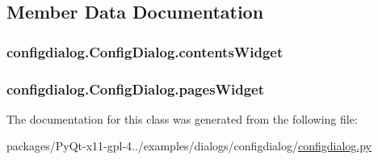 \subsection{Member Data Documentation}
\hypertarget{classconfigdialog_1_1ConfigDialog_a32b868578d2b6954f894bd13976c6652}{}
\subsubsection[{contents\+Widget}]{\setlength{\rightskip}{0pt plus 5cm}configdialog.\+Config\+Dialog.\+contents\+Widget}\label{classconfigdialog_1_1ConfigDialog_a32b868578d2b6954f894bd13976c6652}
\hypertarget{classconfigdialog_1_1ConfigDialog_aecd579b669260d53fdd59ccae7f0044e}{}
\subsubsection[{pages\+Widget}]{\setlength{\rightskip}{0pt plus 5cm}configdialog.\+Config\+Dialog.\+pages\+Widget}\label{classconfigdialog_1_1ConfigDialog_aecd579b669260d53fdd59ccae7f0044e}


The documentation for this class was generated from the following file\+:\begin{DoxyCompactItemize}
\item 
packages/\+Py\+Qt-\/x11-\/gpl-\/4../examples/dialogs/configdialog/\hyperlink{configdialog_8py}{configdialog.\+py}\end{DoxyCompactItemize}
